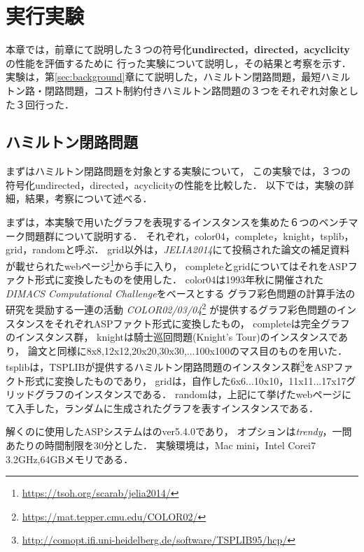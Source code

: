 \chapter{実行実験}
本章では，前章にて説明した３つの符号化\textbf{undirected}，\textbf{directed}，\textbf{acyclicity}の性能を評価するために
行った実験について説明し，その結果と考察を示す．
実験は，第\ref{sec:background}章にて説明した，ハミルトン閉路問題，最短ハミルトン路・閉路問題，コスト制約付きハミルトン路問題の３つをそれぞれ対象とした３回行った．
\section{ハミルトン閉路問題}
まずはハミルトン閉路問題を対象とする実験について，
この実験では，３つの符号化undirected，directed，acyclicityの性能を比較した．
以下では，実験の詳細，結果，考察について述べる．

まずは，本実験で用いたグラフを表現するインスタンスを集めた６つのベンチマーク問題群について説明する．
それぞれ，color04，complete，knight，tsplib，grid，randomと呼ぶ．
grid以外は，\textit{JELIA2014}にて投稿された論文\cite{soh14}の補足資料
が載せられたwebページ\footnote{\url{https://tsoh.org/scarab/jelia2014/}}から手に入り，
completeとgridについてはそれをASPファクト形式に変換したものを使用した．
color04は1993年秋に開催された\textit{DIMACS Computational Challenge}をベースとする
グラフ彩色問題の計算手法の研究を奨励する一連の活動
\textit{COLOR02/03/04}\footnote{\url{https://mat.tepper.cmu.edu/COLOR02/}}
が提供するグラフ彩色問題のインスタンスをそれぞれASPファクト形式に変換したもの，
completeは完全グラフのインスタンス群，
knightは騎士巡回問題(Knight's Tour)のインスタンスであり，
論文\cite{soh14}と同様に8x8,12x12,20x20,30x30,...100x100のマス目のものを用いた．
tsplibは，TSPLIBが提供するハミルトン閉路問題のインスタンス群\footnote{\url{http://comopt.ifi.uni-heidelberg.de/software/TSPLIB95/hcp/}}をASPファクト形式に変換したものであり，
gridは，自作した6x6...10x10，11x11...17x17グリッドグラフのインスタンスである．
randomは，上記にて挙げたwebページ\footnotemark[1]にて入手した，ランダムに生成されたグラフを表すインスタンスである．

解くのに使用したASPシステムは{\clingo}のver5.4.0であり，
オプションは\textit{trendy}，一問あたりの時間制限を30分とした．
実験環境は，Mac mini，Intel Corei7 3.2GHz,64GBメモリである．

